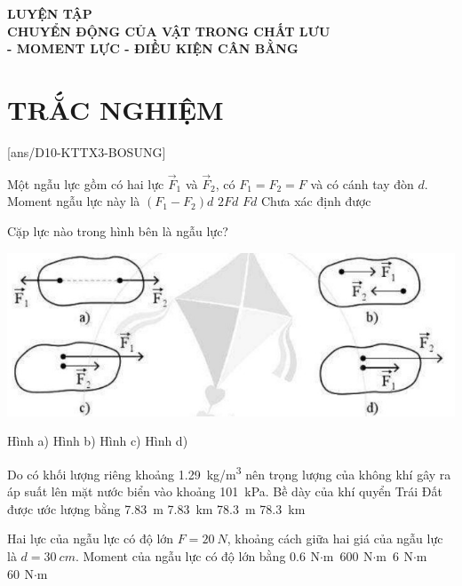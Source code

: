 \begin{center}\textbf{\color{red}LUYỆN TẬP}\\
	\textbf{CHUYỂN ĐỘNG CỦA VẬT TRONG CHẤT LƯU \\- MOMENT LỰC - ĐIỀU KIỆN CÂN BẰNG}
\end{center}
\section{TRẮC NGHIỆM}
[ans/D10-KTTX3-BOSUNG]
\begin{ex}
	Một ngẫu lực gồm có hai lực $\vec F_1$ và $\vec F_2$, có $F_1 = F_2 = F$ và có cánh tay đòn $d$. Moment ngẫu lực này là	
	\choice
	{$(F_1-F_2)d$}
	{$2Fd$}
	{\True $Fd$}
	{Chưa xác định được}
	\loigiai{}
\end{ex}
\begin{ex}
	Cặp lực nào trong hình bên là ngẫu lực?
	\begin{center}
		\includegraphics[scale=0.8]{../figs/D10-KTTX3-BOSUNG-2}
	\end{center}
	\choice
	{Hình a)}
	{\True Hình b)}
	{Hình c)}
	{Hình d)}
	\loigiai{}
\end{ex}
\begin{ex}
	Do có khối lượng riêng khoảng \SI{1.29}{\kilogram/\meter^3} nên trọng lượng của không khí gây ra áp suất lên mặt nước biển vào khoảng \SI{101}{\kilo\pascal}. Bề dày của khí quyển Trái Đất được ước lượng bằng
	\choice
	{\SI{7.83}{\meter}}
	{\True \SI{7.83}{\kilo\meter}}
	{\SI{78.3}{\meter}}
	{\SI{78.3}{\kilo\meter}}
	\loigiai{}
\end{ex}
\begin{ex}
	Hai lực của ngẫu lực có độ lớn $F=\SI{20}{N}$, khoảng cách giữa hai giá của ngẫu lực là $d=\SI{30}{cm}$. Moment của ngẫu lực có độ lớn bằng
	\choice
	{$\SI{0.6}{\newton\cdot\meter}$}
	{$\SI{600}{\newton\cdot\meter}$}
	{\True $\SI{6}{\newton\cdot\meter}$}
	{$\SI{60}{\newton\cdot\meter}$}
\end{ex}
